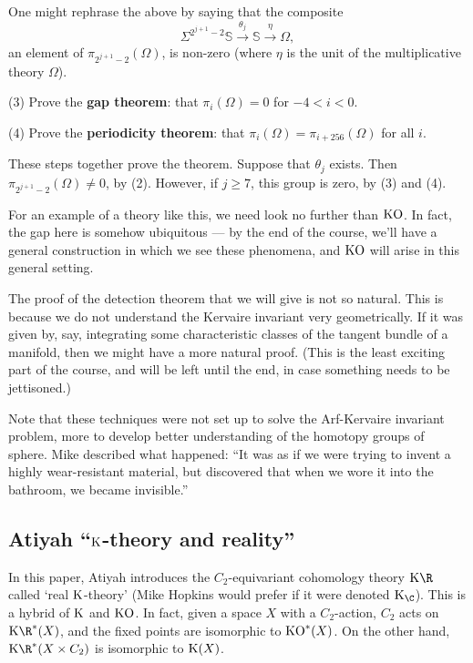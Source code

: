 \documentclass[11pt]{article}
\begin{document}
\begin{FirstWeek}
\begin{itemise}
One might rephrase the above by saying that the composite
\[\Sigma^{2^{j+1}-2}\mathbb{S}\overset{\theta_j}{\to}\mathbb{S}\overset{\eta}
{\to}\Omega,\]
an element of $\pi_{2^{j+1}-2}(\Omega)$, is non-zero (where $\eta$ is the unit
of the multiplicative theory $\Omega$).
\item[(3)] Prove the \textbf{gap theorem}: that $\pi_i(\Omega)=0$ for $-4<i<0$.
\item[(4)] Prove the \textbf{periodicity theorem}: that
$\pi_i(\Omega)=\pi_{i+256}(\Omega)$ for all $i$.
\end{itemise}
These steps together prove the theorem. Suppose that $\theta_j$ exists. Then
$\pi_{2^{j+1}-2}(\Omega)\neq0$, by (2). However, if $j\geq7$, this group is
zero, by (3) and (4).

For an example of a theory like this, we need look no further than $\operatorname{{KO}}$. In
fact, the gap here is somehow ubiquitous --- by the end of the course, we'll
have a general construction in which we see these phenomena, and $\operatorname{{KO}}$ will
arise in this general setting.

The proof of the detection theorem that we will give is not so natural. This is
because we do not understand the Kervaire invariant very geometrically. If it
was given by, say, integrating some characteristic classes of the tangent bundle
of a manifold, then we might have a more natural proof. {\small(This is the
least exciting part of the course, and will be left until the end, in case
something needs to be jettisoned.)}

Note that these techniques were not set up to solve the Arf-Kervaire invariant
problem, more to develop better understanding of the homotopy groups of sphere.
Mike described what happened: ``It was as if we were trying to invent a highly
wear-resistant material, but discovered that when we wore it into the bathroom,
we became invisible.''

\subsection*{Atiyah ``\texorpdfstring{$\operatorname{{K}}$}{K}-theory and reality''}
In this paper, Atiyah introduces the $C_2$-equivariant cohomology theory $\KR$
called `real $\operatorname{{K}}$-theory' (Mike Hopkins would prefer if it were denoted
${\K_\C}$). This is a hybrid of $\operatorname{{K}}$ and $\operatorname{{KO}}$. In fact, given a space $X$ with
a $C_2$-action, $C_2$ acts on $\KR^*(X)$, and the fixed points are isomorphic to
$\operatorname{{KO}}^*(X)$. On the other hand, $\KR^*(X\times C_2)$ is isomorphic to $\operatorname{{K}}(X)$.


\end{FirstWeek}
\end{document}
